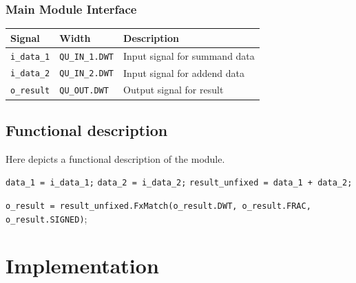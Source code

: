 \documentclass[a4paper, oneside]{report}
\begin{document}
            \subsection{Main Module Interface}
                \begin{longtable}{lll}
                    \toprule
                    \textbf{Signal}      & \textbf{Width}    & \textbf{Description} \\
                    \midrule
                    \texttt{i\_data\_1}      & \texttt{QU\_IN\_1.DWT}         & Input signal for summand data \\
                    \texttt{i\_data\_2}      & \texttt{QU\_IN\_2.DWT}        & Input signal for addend data \\
                    \texttt{o\_result}    & \texttt{QU\_OUT.DWT}         & Output signal for result \\
                    \bottomrule
                \end{longtable}
        
        \section{Functional description}
        Here depicts a functional description of the module.

        \begin{algorithm}[H]
            \caption{Module function}
            \BlankLine
                    \texttt{data\_1 = i\_data\_1;}
                    \BlankLine
                    \texttt{data\_2 = i\_data\_2;}
                \BlankLine
            \texttt{result\_unfixed = data\_1 + data\_2;}
            \BlankLine
         
            \texttt{o\_result = result\_unfixed.FxMatch(o\_result.DWT, o\_result.FRAC, o\_result.SIGNED)};
           
        \end{algorithm}

        

    \chapter{Implementation}
\end{document}

